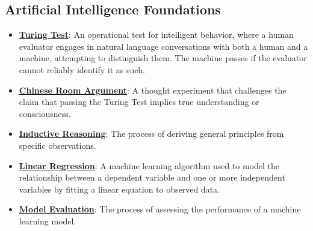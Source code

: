 \documentclass{article}%
\begin{document}
%
\subsection{Artificial Intelligence Foundations}%
\label{subsec:ArtificialIntelligenceFoundations}%
\begin{itemize}[leftmargin=*]%
\item \href{https://purdue.brightspace.com/d2l/common/assets/pdfjs-d2l-dist/1.0.14-legacy/web/viewer.html?file=\%2Fcontent\%2Fenforced\%2F1095467-wl.202510.CS.24300.001\%2F02L2-Intro.pdf\%3Fou\%3D1095467\&lang=en-us\&container=d2l-fileviewer-rendered-pdf\&fullscreen=d2l-fileviewer-rendered-pdf-dialog\&height=667#page=6}{\textbf{Turing Test}}: An operational test for intelligent behavior, where a human evaluator engages in natural language conversations with both a human and a machine, attempting to distinguish them. The machine passes if the evaluator cannot reliably identify it as such.%
\item \href{https://purdue.brightspace.com/d2l/common/assets/pdfjs-d2l-dist/1.0.14-legacy/web/viewer.html?file=\%2Fcontent\%2Fenforced\%2F1095467-wl.202510.CS.24300.001\%2F02L2-Intro.pdf\%3Fou\%3D1095467\&lang=en-us\&container=d2l-fileviewer-rendered-pdf\&fullscreen=d2l-fileviewer-rendered-pdf-dialog\&height=667#page=7}{\textbf{Chinese Room Argument}}: A thought experiment that challenges the claim that passing the Turing Test implies true understanding or consciousness.%
\item \href{https://purdue.brightspace.com/d2l/common/assets/pdfjs-d2l-dist/1.0.14-legacy/web/viewer.html?file=\%2Fcontent\%2Fenforced\%2F1095467-wl.202510.CS.24300.001\%2F05L2-ML Basics.pdf\%3Fou\%3D1095467\&lang=en-us\&container=d2l-fileviewer-rendered-pdf\&fullscreen=d2l-fileviewer-rendered-pdf-dialog\&height=667#page=3}{\textbf{Inductive Reasoning}}: The process of deriving general principles from specific observations.%
\item \href{https://purdue.brightspace.com/d2l/common/assets/pdfjs-d2l-dist/1.0.14-legacy/web/viewer.html?file=\%2Fcontent\%2Fenforced\%2F1095467-wl.202510.CS.24300.001\%2F05L2-ML Basics.pdf\%3Fou\%3D1095467\&lang=en-us\&container=d2l-fileviewer-rendered-pdf\&fullscreen=d2l-fileviewer-rendered-pdf-dialog\&height=667#page=6}{\textbf{Linear Regression}}: A machine learning algorithm used to model the relationship between a dependent variable and one or more independent variables by fitting a linear equation to observed data.%
\item \href{https://purdue.brightspace.com/d2l/common/assets/pdfjs-d2l-dist/1.0.14-legacy/web/viewer.html?file=\%2Fcontent\%2Fenforced\%2F1095467-wl.202510.CS.24300.001\%2F05L2-ML Basics.pdf\%3Fou\%3D1095467\&lang=en-us\&container=d2l-fileviewer-rendered-pdf\&fullscreen=d2l-fileviewer-rendered-pdf-dialog\&height=667#page=8}{\textbf{Model Evaluation}}: The process of assessing the performance of a machine learning model.%

\end{itemize}
\end{document}
